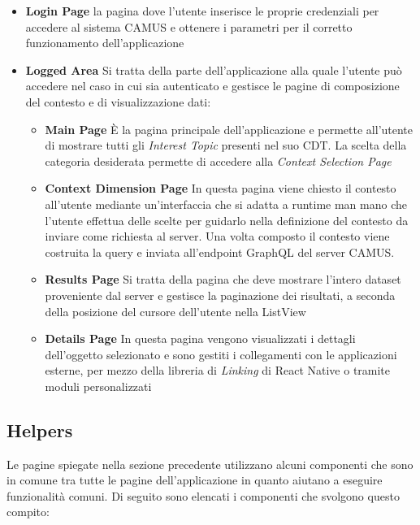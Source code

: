 \begin{itemize}
	\item \textbf{Login Page}
	\upe la pagina dove l'utente inserisce le proprie credenziali per accedere al sistema CAMUS e ottenere i parametri per il corretto funzionamento dell'applicazione
	\item \textbf{Logged Area}
	Si tratta della parte dell'applicazione alla quale l'utente può accedere nel caso in cui sia autenticato e gestisce le pagine di composizione del contesto e di visualizzazione dati:
	\begin{itemize}
		\item \textbf{Main Page}
		È la pagina principale dell'applicazione e permette all'utente di mostrare tutti gli \emph{Interest Topic} presenti nel suo CDT. La scelta della categoria desiderata permette di accedere alla \emph{Context Selection Page}
		\item \textbf{Context Dimension Page}
		In questa pagina viene chiesto il contesto all'utente mediante un'interfaccia che si adatta a runtime man mano che l'utente effettua delle scelte per guidarlo nella definizione del contesto da inviare come richiesta al server. Una volta composto il contesto viene costruita la query e inviata all'endpoint GraphQL del server CAMUS. 
		\item \textbf{Results Page}
		Si tratta della pagina che deve mostrare l'intero dataset proveniente dal server e gestisce la paginazione dei risultati, a seconda della posizione del cursore dell'utente nella ListView 
		\item \textbf{Details Page}
		In questa pagina vengono visualizzati i dettagli dell'oggetto selezionato e sono gestiti i collegamenti con le applicazioni esterne, per mezzo della libreria di \emph{Linking} di React Native o tramite moduli personalizzati
	\end{itemize}
\end{itemize}

\subsection{Helpers}

Le pagine spiegate nella sezione precedente utilizzano alcuni componenti che sono in comune tra tutte le pagine dell'applicazione in quanto aiutano a eseguire funzionalità comuni. Di seguito sono elencati i componenti che svolgono questo compito:

